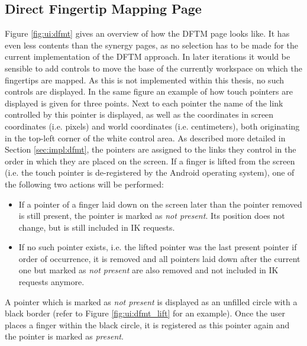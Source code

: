 \subsection{Direct Fingertip Mapping Page}

Figure \ref{fig:ui:dfmt} gives an overview of how the DFTM page looks like. It has even less contents than the synergy pages, as no selection has to be made for the current implementation of the DFTM approach. In later iterations it would be sensible to add controls to move the base of the currently workspace on which the fingertips are mapped. As this is not implemented within this thesis, no such controls are displayed. In the same figure an example of how touch pointers are displayed is given for three points. Next to each pointer the name of the link controlled by this pointer is displayed, as well as the coordinates in screen coordinates (i.e. pixels) and world coordinates (i.e. centimeters), both originating in the top-left corner of the white control area. As described more detailed in Section \ref{sec:impl:dfmt}, the pointers are assigned to the links they control in the order in which they are placed on the screen.
If a finger is lifted from the screen (i.e. the touch pointer is de-registered by the Android operating system), one of the following two actions will be performed:
\begin{itemize}
	\item If a pointer of a finger laid down on the screen later than the pointer removed is still present, the pointer is marked as \textit{not present}. Its position does not change, but is still included in IK requests. 
	\item If no such pointer exists, i.e. the lifted pointer was the last present pointer if order of occurrence, it is removed and all pointers laid down after the current one but marked as \textit{not present} are also removed and not included in IK requests anymore.
\end{itemize}

A pointer which is marked as \textit{not present} is displayed as an unfilled circle with a black border (refer to Figure \ref{fig:ui:dfmt_lift} for an example). Once the user places a finger within the black circle, it is registered as this pointer again and the pointer is marked as \textit{present}.

